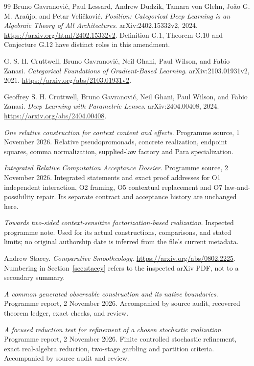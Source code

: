 \documentclass[11pt]{article}
\theoremstyle{remark}
\begin{document}
\begin{thebibliography}{99}
Bruno Gavranovi\'{c}, Paul Lessard, Andrew Dudzik, Tamara von Glehn, Jo\~ao G. M. Ara\'{u}jo, and Petar Veli\v{c}kovi\'{c}.
\emph{Position: Categorical Deep Learning is an Algebraic Theory of All Architectures}.
arXiv:2402.15332v2, 2024.
\url{https://arxiv.org/html/2402.15332v2}.
Definition G.1, Theorem G.10 and Conjecture G.12 have distinct roles in this amendment.

G. S. H. Cruttwell, Bruno Gavranovi\'{c}, Neil Ghani, Paul Wilson, and Fabio Zanasi.
\emph{Categorical Foundations of Gradient-Based Learning}.
arXiv:2103.01931v2, 2021.
\url{https://arxiv.org/abs/2103.01931v2}.

Geoffrey S. H. Cruttwell, Bruno Gavranovi\'{c}, Neil Ghani, Paul Wilson, and Fabio Zanasi.
\emph{Deep Learning with Parametric Lenses}.
arXiv:2404.00408, 2024.
\url{https://arxiv.org/abs/2404.00408}.

\emph{One relative construction for context content and effects}.
Programme source, 1 November 2026. Relative pseudopromonads, concrete realization, endpoint squares, comma normalization, supplied-law factory and Para specialization.

\emph{Integrated Relative Computation Acceptance Dossier}.
Programme source, 2 November 2026. Integrated statements and exact proof addresses for O1 independent interaction, O2 framing, O5 contextual replacement and O7 law-and-possibility repair. Its separate contract and acceptance history are unchanged here.

\emph{Towards two-sided context-sensitive factorization-based realization}.
Inspected programme note. Used for its actual constructions, comparisons, and stated limits; no original authorship date is inferred from the file's current metadata.

Andrew Stacey. \emph{Comparative Smootheology}.
\url{https://arxiv.org/abs/0802.2225}.
Numbering in Section~\ref{sec:stacey} refers to the inspected arXiv PDF, not to a secondary summary.

\emph{A common generated observable construction and its native boundaries}.
Programme report, 2 November 2026. Accompanied by source audit, recovered theorem ledger, exact checks, and review.

\emph{A focused reduction test for refinement of a chosen stochastic realization}. Programme report, 2 November 2026.
Finite controlled stochastic refinement, exact real-algebra reduction, two-stage garbling and partition criteria. Accompanied by source audit and review.


\end{thebibliography}
\end{document}
